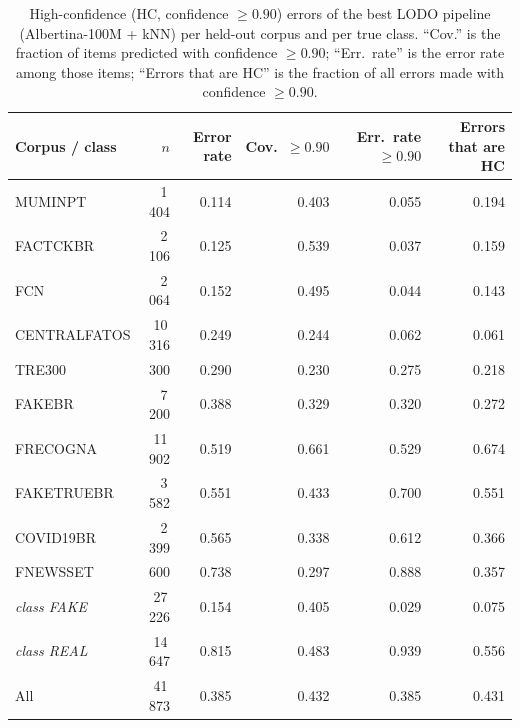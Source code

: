 \begin{table}[t]
\centering
\small
\caption{High-confidence (HC, confidence $\ge 0.90$) errors of the best LODO pipeline (Albertina-100M + kNN) per held-out corpus and per true class. ``Cov.'' is the fraction of items predicted with confidence $\ge 0.90$; ``Err.\ rate'' is the error rate among those items; ``Errors that are HC'' is the fraction of all errors made with confidence $\ge 0.90$.}
\label{tab:high-conf-errors}
\begin{tabular}{lrrrrr}
\toprule
Corpus / class & $n$ & Error rate & Cov.\ $\ge 0.90$ & Err.\ rate $\ge 0.90$ & Errors that are HC \\
\midrule
MUMINPT & 1\,404 & 0.114 & 0.403 & 0.055 & 0.194 \\
FACTCKBR & 2\,106 & 0.125 & 0.539 & 0.037 & 0.159 \\
FCN & 2\,064 & 0.152 & 0.495 & 0.044 & 0.143 \\
CENTRALFATOS & 10\,316 & 0.249 & 0.244 & 0.062 & 0.061 \\
TRE300 & 300 & 0.290 & 0.230 & 0.275 & 0.218 \\
FAKEBR & 7\,200 & 0.388 & 0.329 & 0.320 & 0.272 \\
FRECOGNA & 11\,902 & 0.519 & 0.661 & 0.529 & 0.674 \\
FAKETRUEBR & 3\,582 & 0.551 & 0.433 & 0.700 & 0.551 \\
COVID19BR & 2\,399 & 0.565 & 0.338 & 0.612 & 0.366 \\
FNEWSSET & 600 & 0.738 & 0.297 & 0.888 & 0.357 \\
\textit{class FAKE} & 27\,226 & 0.154 & 0.405 & 0.029 & 0.075 \\
\textit{class REAL} & 14\,647 & 0.815 & 0.483 & 0.939 & 0.556 \\
\midrule All & 41\,873 & 0.385 & 0.432 & 0.385 & 0.431 \\
\bottomrule
\end{tabular}
\end{table}
